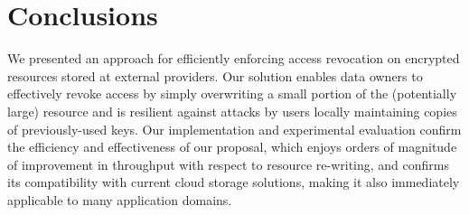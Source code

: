 \section{Conclusions}\label{ms:sec:conclu}
We presented an approach for efficiently enforcing access revocation on encrypted resources stored at external providers. Our solution enables data owners to effectively revoke access by simply overwriting a small portion of the (potentially large) resource and is resilient against attacks by users locally maintaining copies of previously-used keys. Our implementation and experimental evaluation confirm the efficiency and effectiveness of our proposal, which enjoys orders of magnitude of improvement in throughput with respect to resource re-writing, and confirms its compatibility with current cloud storage solutions, making it also immediately applicable to many application domains.
